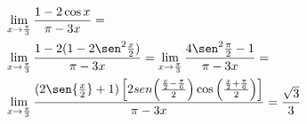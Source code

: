 \begin{ex}
\begin{align}
&\lim_{x\rightarrow \frac{\pi}{3}} \frac{1-2\cos{x}}{\pi-3x}=\nonumber\\
&\lim_{x\rightarrow \frac{\pi}{3}} \frac{1-2(1-2\sen^2{\frac{x}{2}})}{\pi-3x}=\lim_{x\rightarrow \frac{\pi}{3}} \frac{4\sen^2{\frac{\pi}{2}-1}}{\pi-3x}=\nonumber\\
&\lim_{x\rightarrow \frac{\pi}{3}} \frac{(2\sen{\frac{x}{2}}+1) \left[ 2sen{\left(\frac{\frac{x}{2}-\frac{\pi}{6}}{2}\right)}\cos{\left(\frac{\frac{x}{2}+\frac{\pi}{6}}{2}\right)}\right]}{\pi-3x}=\frac{\sqrt{3}}{3}
\nonumber
\end{align}
\end{ex}